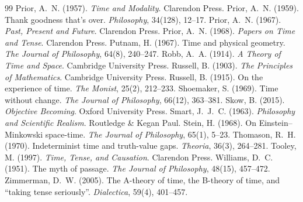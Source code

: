\documentclass{situationist-preprint}
\begin{document}
\begin{thebibliography}{99}
 Prior, A.~N. (1957). \emph{Time and Modality}. Clarendon Press.
 Prior, A.~N. (1959). Thank goodness that's over. \emph{Philosophy}, 34(128), 12--17.
 Prior, A.~N. (1967). \emph{Past, Present and Future}. Clarendon Press.
 Prior, A.~N. (1968). \emph{Papers on Time and Tense}. Clarendon Press.
 Putnam, H. (1967). Time and physical geometry. \emph{The Journal of Philosophy}, 64(8), 240--247.
 Robb, A.~A. (1914). \emph{A Theory of Time and Space}. Cambridge University Press.
 Russell, B. (1903). \emph{The Principles of Mathematics}. Cambridge University Press.
 Russell, B. (1915). On the experience of time. \emph{The Monist}, 25(2), 212--233.
 Shoemaker, S. (1969). Time without change. \emph{The Journal of Philosophy}, 66(12), 363--381.
 Skow, B. (2015). \emph{Objective Becoming}. Oxford University Press.
 Smart, J.~J.~C. (1963). \emph{Philosophy and Scientific Realism}. Routledge \& Kegan Paul.
 Stein, H. (1968). On Einstein--Minkowski space-time. \emph{The Journal of Philosophy}, 65(1), 5--23.
 Thomason, R.~H. (1970). Indeterminist time and truth-value gaps. \emph{Theoria}, 36(3), 264--281.
 Tooley, M. (1997). \emph{Time, Tense, and Causation}. Clarendon Press.
 Williams, D.~C. (1951). The myth of passage. \emph{The Journal of Philosophy}, 48(15), 457--472.
 Zimmerman, D.~W. (2005). The A-theory of time, the B-theory of time, and \enquote{taking tense seriously}. \emph{Dialectica}, 59(4), 401--457.
\end{thebibliography}
\end{document}
